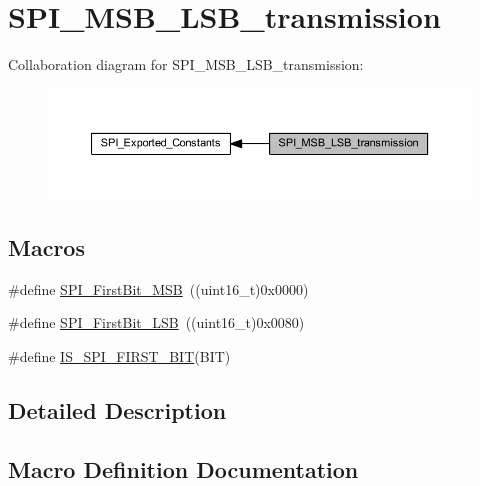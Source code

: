 \hypertarget{group___s_p_i___m_s_b___l_s_b__transmission}{}\section{S\+P\+I\+\_\+\+M\+S\+B\+\_\+\+L\+S\+B\+\_\+transmission}
\label{group___s_p_i___m_s_b___l_s_b__transmission}
Collaboration diagram for S\+P\+I\+\_\+\+M\+S\+B\+\_\+\+L\+S\+B\+\_\+transmission\+:
\nopagebreak
\begin{figure}[H]
\begin{center}
\leavevmode
\includegraphics[width=350pt]{group___s_p_i___m_s_b___l_s_b__transmission}
\end{center}
\end{figure}
\subsection*{Macros}
\begin{DoxyCompactItemize}
\item 
\#define \hyperlink{group___s_p_i___m_s_b___l_s_b__transmission_ga45e688f93a93b605886240cad23bc2eb}{S\+P\+I\+\_\+\+First\+Bit\+\_\+\+M\+SB}~((uint16\+\_\+t)0x0000)
\item 
\#define \hyperlink{group___s_p_i___m_s_b___l_s_b__transmission_ga5ef57fca79434cbc517e4ede548ca02d}{S\+P\+I\+\_\+\+First\+Bit\+\_\+\+L\+SB}~((uint16\+\_\+t)0x0080)
\item 
\#define \hyperlink{group___s_p_i___m_s_b___l_s_b__transmission_gabee8e0302741f4a5c41b96af640c63ad}{I\+S\+\_\+\+S\+P\+I\+\_\+\+F\+I\+R\+S\+T\+\_\+\+B\+IT}(B\+IT)
\end{DoxyCompactItemize}


\subsection{Detailed Description}


\subsection{Macro Definition Documentation}
\mbox{\label{group___s_p_i___m_s_b___l_s_b__transmission_gabee8e0302741f4a5c41b96af640c63ad}} 
